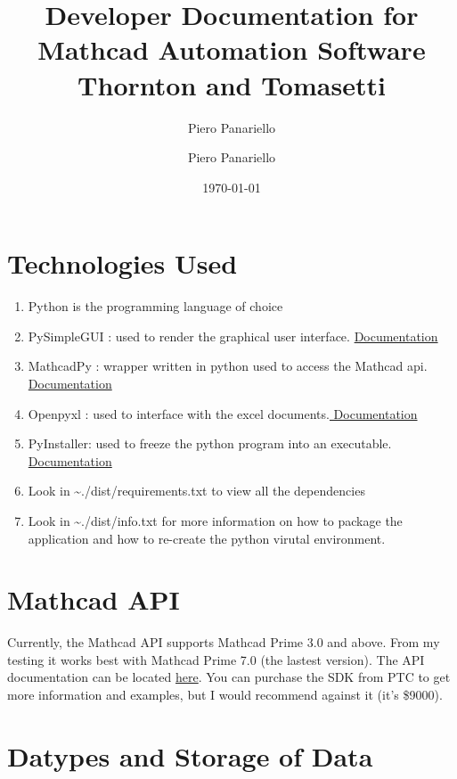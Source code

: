\documentclass[11pt]{article}
\author{Piero Panariello}
\author{Piero Panariello}
\date{\today}
\title{Developer Documentation for Mathcad Automation Software\\\medskip
\large Thornton and Tomasetti}
\begin{document}
\maketitle
\tableofcontents


\section{Technologies Used}
\label{sec:org6dd1b6f}
\begin{enumerate}
\item Python is the programming language of choice
\item PySimpleGUI : used to render the graphical user interface. \href{https://pysimplegui.readthedocs.io/en/latest/}{Documentation}
\item MathcadPy : wrapper written in python used to access the Mathcad api. \href{https://github.com/MattWoodhead/MathcadPy/blob/master/MathcadPy/\_application.py}{Documentation}
\item Openpyxl : used to interface with the excel documents.\href{https://openpyxl.readthedocs.io/en/stable/}{ Documentation}
\item PyInstaller: used to freeze the python program into an executable.\href{https://pyinstaller.readthedocs.io/en/stable/}{ Documentation}
\item Look in \textasciitilde{}./dist/requirements.txt to view all the dependencies
\item Look in \textasciitilde{}./dist/info.txt for more information on how to package the application and how to re-create the python virutal environment.
\end{enumerate}

\section{Mathcad API}
\label{sec:org28a2280}
Currently, the Mathcad API supports Mathcad Prime 3.0 and above. From my testing it works best with Mathcad Prime 7.0 (the lastest version). The API documentation can be located \href{https://support.ptc.com/help/mathcad/r7.0/en/index.html\#page/PTC\_Mathcad\_Help\%2Fmathcad\_and\_automation\_api.html\%23}{here}. You can purchase the SDK from PTC to get more information and examples, but I would recommend against it (it's \$9000).
\section{Datypes and Storage of Data}
\label{sec:org129ae49}
\end{document}
